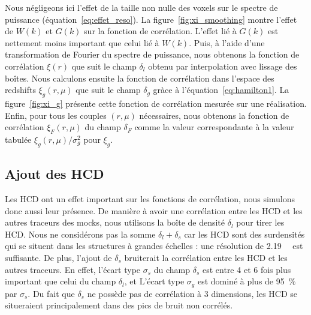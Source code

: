 Nous négligeons ici l'effet de la taille non nulle des voxels sur le spectre de puissance (équation~\ref{eq:effet_reso}).
La figure~\ref{fig:xi_smoothing} montre l'effet de $W(k)$ et $G(k)$ sur la fonction de corrélation. L'effet lié à $G(k)$ est nettement moins important que celui lié à $W(k)$.
Puis, à l'aide d'une transformation de Fourier du spectre de puissance, nous obtenons la fonction de corrélation $\xi(r)$ que suit le champ $\delta_l$ obtenu par interpolation avec lissage des boîtes.
Nous calculons ensuite la fonction de corrélation dans l'espace des redshifts $\xi_g(r, \mu)$ que suit le champ $\delta_g$ gràce à l'équation~\ref{eq:hamilton1}. La figure~\ref{fig:xi_g} présente cette fonction de corrélation mesurée sur une réalisation. Enfin, pour tous les couples $(r,\mu)$ nécessaires, nous obtenons la fonction de corrélation $\xi_F(r, \mu)$ du champ $\delta_F$ comme la valeur correspondante à la valeur tabulée $\xi_g(r, \mu) / \sigma_g^2$ pour $\xi_g$.



\subsection{Ajout des HCD}
\label{subsec:hcd}
Les HCD ont un effet important sur les fonctions de corrélation, nous simulons donc aussi leur présence. De manière à avoir une corrélation entre les HCD et les autres traceurs des mocks, nous utilisons la boîte de densité $\delta_l$ pour tirer les HCD. Nous ne considérons pas la somme $\delta_l + \delta_s$ car les HCD sont des surdensités qui se situent dans les structures à grandes échelles : une résolution de \SI{2.19}{\perh\Mpc} est suffisante. De plus, l'ajout de $\delta_s$ bruiterait la corrélation entre les HCD et les autres traceurs. En effet, l'écart type $\sigma_s$ du champ $\delta_s$ est entre 4 et 6 fois plus important que celui du champ $\delta_l$, et L'écart type $\sigma_g$ est dominé à plus de \SI{95}{\percent} par $\sigma_s$. Du fait que $\delta_s$ ne possède pas de corrélation à 3 dimensions, les HCD se situeraient principalement dans des pics de bruit non corrélés.


